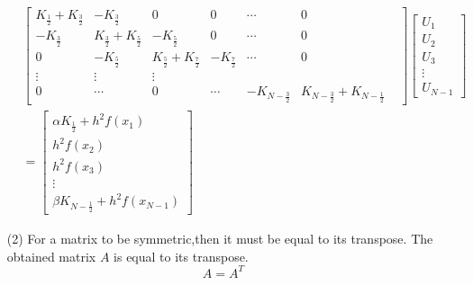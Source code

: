 \documentclass[12pt,a4paper]{article}
\begin{document}
\begin{itemize}
\begin{align*}
	&\begin{bmatrix}
	K_{\frac{1}{2}}+K_{\frac{3}{2}}& -K_{\frac{3}{2}}  & 0&0& \cdots&0 \\
	-K_{\frac{3}{2}}& K_{\frac{3}{2}}+K_{\frac{5}{2}}&-K_{\frac{5}{2}}&0&\cdots&0
	\\
	0&-K_{\frac{5}{2}}&K_{\frac{5}{2}}+K_{\frac{7}{2}}&-K_{\frac{7}{2}}&\cdots&0&\\
	\vdots& \vdots&\vdots\\
	0 &\cdots&0&\cdots&-K_{N-\frac{3}{2}}&K_{N-\frac{3}{2}}+K_{N-\frac{1}{2}}
	\end{bmatrix}\begin{bmatrix}
	U_{1}\\
	U_{2}\\
	U_{3}\\
	\vdots\\
	U_{N-1}
	\end{bmatrix}\\&=\begin{bmatrix}
	\alpha K_{\frac{1}{2}}+h^{2}f(x_{1})\\
	h^{2}f(x_{2})\\
	h^{2}f(x_{3})\\
	\vdots\\
	\beta K_{N-\frac{1}{2}}+h^{2}f(x_{N-1})
	\end{bmatrix}
	\end{align*}
	\item[(2)] For a matrix to be symmetric,then it must be equal to its transpose. The obtained matrix $A$ is equal to its transpose.
	$$A=A^{T}$$

\end{itemize}
\end{document}

